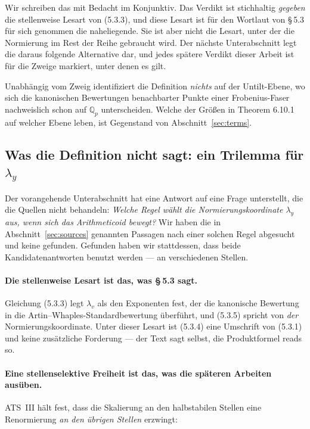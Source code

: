 \documentclass[11pt,a4paper]{article}
\theoremstyle{definition}
\theoremstyle{plain}
\theoremstyle{definition}
\begin{document}
Wir schreiben das mit Bedacht im Konjunktiv. Das Verdikt ist stichhaltig
\emph{gegeben} die stellenweise Lesart von (5.3.3), und diese Lesart ist für den
Wortlaut von \S\,5.3 für sich genommen die naheliegende. Sie ist aber nicht die
Lesart, unter der die Normierung im Rest der Reihe gebraucht wird. Der nächste
Unterabschnitt legt die daraus folgende Alternative dar, und jedes spätere Verdikt
dieser Arbeit ist für die Zweige markiert, unter denen es gilt.

Unabhängig vom Zweig identifiziert die Definition \emph{nichts} auf der
Untilt-Ebene, wo sich die kanonischen Bewertungen benachbarter
Punkte einer Frobenius-Faser nachweislich schon auf $\mathbb{Q}_p$ unterscheiden.
Welche der Größen in Theorem 6.10.1 auf welcher Ebene leben, ist Gegenstand von
Abschnitt~\ref{sec:terms}.

\subsection{Was die Definition nicht sagt: ein Trilemma für
\texorpdfstring{$\lambda_y$}{lambda\_y}}
\label{sec:trilemma}

Der vorangehende Unterabschnitt hat eine Antwort auf eine Frage unterstellt, die
die Quellen nicht behandeln: \emph{Welche Regel wählt die Normierungskoordinate
$\lambda_y$ aus, wenn sich das Arithmeticoid bewegt?} Wir haben die in
Abschnitt~\ref{sec:sources} genannten Passagen nach einer solchen Regel abgesucht
und keine gefunden. Gefunden haben wir stattdessen, dass beide Kandidatenantworten
benutzt werden --- an verschiedenen Stellen.

\paragraph{Die stellenweise Lesart ist das, was \S\,5.3 sagt.}
Gleichung (5.3.3) legt $\lambda_v$ als den Exponenten fest, der die kanonische
Bewertung in die Artin--Whaples-Standardbewertung überführt, und (5.3.5) spricht
von \emph{der} Normierungskoordinate. Unter dieser Lesart ist (5.3.4) eine
Umschrift von (5.3.1) und keine zusätzliche Forderung --- der Text sagt selbst,
die Produktformel \glqq reads\grqq{} so.

\paragraph{Eine stellenselektive Freiheit ist das, was die späteren Arbeiten
ausüben.}
ATS~III hält fest, dass die Skalierung an den halbstabilen Stellen eine
Renormierung \emph{an den übrigen Stellen} erzwingt:
\end{document}
